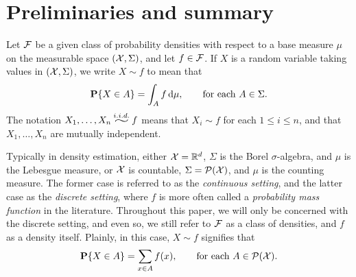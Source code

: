 \section{Preliminaries and summary}

Let $\mathcal{F}$ be a given class of probability densities with respect to a
base measure $\mu$ on the measurable space $(\mathcal{X}, \Sigma)$, and let
$f \in \mathcal{F}$. If $X$ is a random variable taking values in
$(\mathcal{X}, \Sigma)$, we write $X \sim f$ to mean that
\[
  \operatorname{\mathbf{P}}\{X \in A\} = \int_A f \mathop{}\!\mathrm{d} \mu , \qquad \text{for each
    $A \in \Sigma$.}
\]
The notation $X_1, \dots, X_n \iid f$ means that $X_i \sim f$ for each
$1 \le i \le n$, and that $X_1, \dots, X_n$ are mutually independent.

Typically in density estimation, either $\mathcal{X} = \mathbb{R}^d$, $\Sigma$ is the
Borel $\sigma$-algebra, and $\mu$ is the Lebesgue measure, or $\mathcal{X}$ is
countable, $\Sigma = \mathcal{P}(\mathcal{X})$, and $\mu$ is the counting measure. The
former case is referred to as the \emph{continuous setting}, and the
latter case as the \emph{discrete setting}, where $f$ is more often
called a \emph{probability mass function} in the
literature. Throughout this paper, we will only be concerned with the
discrete setting, and even so, we still refer to $\mathcal{F}$ as a class of
densities, and $f$ as a density itself. Plainly, in this case,
$X \sim f$ signifies that
\[
  \operatorname{\mathbf{P}}\{X \in A\} = \sum_{x \in A} f(x) , \qquad \text{for each $A \in \mathcal{P}(\mathcal{X})$.}
\]

